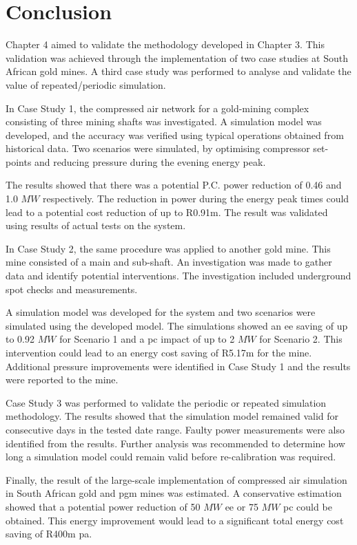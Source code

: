 \section{Conclusion}
Chapter 4 aimed to validate the methodology developed in Chapter 3. This validation was achieved through the implementation of two case studies at South African gold mines. A third case study was performed to analyse and validate the value of repeated/periodic simulation.
\par 
In Case Study 1, the compressed air network for a gold-mining complex consisting of three mining shafts was investigated. A simulation model was developed, and the accuracy was verified using typical operations obtained from historical data. Two scenarios were simulated, by optimising compressor set-points and reducing pressure during the evening energy peak.
\par 
The results showed that there was a potential P.C. power reduction of 0.46 and 1.0 $MW$ respectively. The reduction in power during the energy peak times could lead to a potential cost reduction of up to R0.91m. The result was validated using results of actual tests on the system.
\par
In Case Study 2, the same procedure was applied to another gold mine. This mine consisted of a main and sub-shaft. An investigation was made to gather data and identify potential interventions. The investigation included underground spot checks and measurements.
\par 
A simulation model was developed for the system and two scenarios were simulated using the developed model. The simulations showed an \gls{ee} saving of up to 0.92 $MW$ for Scenario 1 and a \gls{pc} impact of up to 2 $MW$ for Scenario 2. This intervention could lead to an energy cost saving of R5.17m for the mine. Additional pressure improvements were identified in Case Study 1 and the results were reported to the mine.
\par
Case Study 3 was performed to validate the periodic or repeated simulation methodology. The results showed that the simulation model remained valid for consecutive days in the tested date range. Faulty power measurements were also identified from the results. Further analysis was recommended to determine how long a simulation model could remain valid before re-calibration was required.
\par 
Finally, the result of the large-scale implementation of compressed air simulation in South African gold and \gls{pgm} mines was estimated. A conservative estimation showed that a potential power reduction of 50 $MW$ \gls{ee} or 75 $ MW $ \gls{pc} could be obtained. This energy improvement would lead to a significant total energy cost saving of R400m \gls{pa}.
